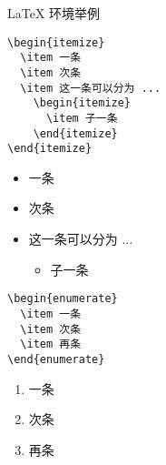 \begin{frame}[fragile]{\LaTeX{} 环境举例}
  \begin{minipage}{0.4\linewidth}
    \begin{lstlisting}[basicstyle=\ttfamily\small]
\begin{itemize}
  \item 一条
  \item 次条
  \item 这一条可以分为 ...
    \begin{itemize}
      \item 子一条
    \end{itemize}
\end{itemize}
\end{lstlisting}
  \end{minipage}\hspace{1.5cm}
  \begin{minipage}{0.4\linewidth}
\begin{itemize}
  \item 一条
  \item 次条
  \item 这一条可以分为 ...
    \begin{itemize}
      \item 子一条
    \end{itemize}
\end{itemize}
  \end{minipage}
\medskip

  \begin{minipage}{0.4\linewidth}
\begin{lstlisting}
\begin{enumerate}
  \item 一条
  \item 次条
  \item 再条
\end{enumerate}
\end{lstlisting}
  \end{minipage}\hspace{1.5cm}
  \begin{minipage}{0.4\linewidth}
\begin{enumerate}
  \item 一条
  \item 次条
  \item 再条
\end{enumerate}
  \end{minipage}
\end{frame}
%

